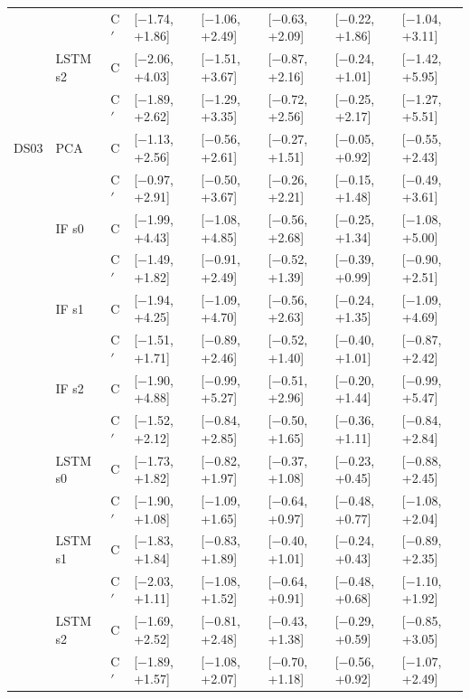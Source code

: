 \begin{scriptsize}
\begin{longtable}{llllllll}
 &  & C$'$ & [$-$1.74, +1.86] & [$-$1.06, +2.49] & [$-$0.63, +2.09] & [$-$0.22, +1.86] & [$-$1.04, +3.11] \\
 & LSTM s2 & C & [$-$2.06, +4.03] & [$-$1.51, +3.67] & [$-$0.87, +2.16] & [$-$0.24, +1.01] & [$-$1.42, +5.95] \\
 &  & C$'$ & [$-$1.89, +2.62] & [$-$1.29, +3.35] & [$-$0.72, +2.56] & [$-$0.25, +2.17] & [$-$1.27, +5.51] \\
\midrule
DS03 & PCA & C & [$-$1.13, +2.56] & [$-$0.56, +2.61] & [$-$0.27, +1.51] & [$-$0.05, +0.92] & [$-$0.55, +2.43] \\
 &  & C$'$ & [$-$0.97, +2.91] & [$-$0.50, +3.67] & [$-$0.26, +2.21] & [$-$0.15, +1.48] & [$-$0.49, +3.61] \\
 & IF s0 & C & [$-$1.99, +4.43] & [$-$1.08, +4.85] & [$-$0.56, +2.68] & [$-$0.25, +1.34] & [$-$1.08, +5.00] \\
 &  & C$'$ & [$-$1.49, +1.82] & [$-$0.91, +2.49] & [$-$0.52, +1.39] & [$-$0.39, +0.99] & [$-$0.90, +2.51] \\
 & IF s1 & C & [$-$1.94, +4.25] & [$-$1.09, +4.70] & [$-$0.56, +2.63] & [$-$0.24, +1.35] & [$-$1.09, +4.69] \\
 &  & C$'$ & [$-$1.51, +1.71] & [$-$0.89, +2.46] & [$-$0.52, +1.40] & [$-$0.40, +1.01] & [$-$0.87, +2.42] \\
 & IF s2 & C & [$-$1.90, +4.88] & [$-$0.99, +5.27] & [$-$0.51, +2.96] & [$-$0.20, +1.44] & [$-$0.99, +5.47] \\
 &  & C$'$ & [$-$1.52, +2.12] & [$-$0.84, +2.85] & [$-$0.50, +1.65] & [$-$0.36, +1.11] & [$-$0.84, +2.84] \\
 & LSTM s0 & C & [$-$1.73, +1.82] & [$-$0.82, +1.97] & [$-$0.37, +1.08] & [$-$0.23, +0.45] & [$-$0.88, +2.45] \\
 &  & C$'$ & [$-$1.90, +1.08] & [$-$1.09, +1.65] & [$-$0.64, +0.97] & [$-$0.48, +0.77] & [$-$1.08, +2.04] \\
 & LSTM s1 & C & [$-$1.83, +1.84] & [$-$0.83, +1.89] & [$-$0.40, +1.01] & [$-$0.24, +0.43] & [$-$0.89, +2.35] \\
 &  & C$'$ & [$-$2.03, +1.11] & [$-$1.08, +1.52] & [$-$0.64, +0.91] & [$-$0.48, +0.68] & [$-$1.10, +1.92] \\
 & LSTM s2 & C & [$-$1.69, +2.52] & [$-$0.81, +2.48] & [$-$0.43, +1.38] & [$-$0.29, +0.59] & [$-$0.85, +3.05] \\
 &  & C$'$ & [$-$1.89, +1.57] & [$-$1.08, +2.07] & [$-$0.70, +1.18] & [$-$0.56, +0.92] & [$-$1.07, +2.49] \\
\end{longtable}
\end{scriptsize}
